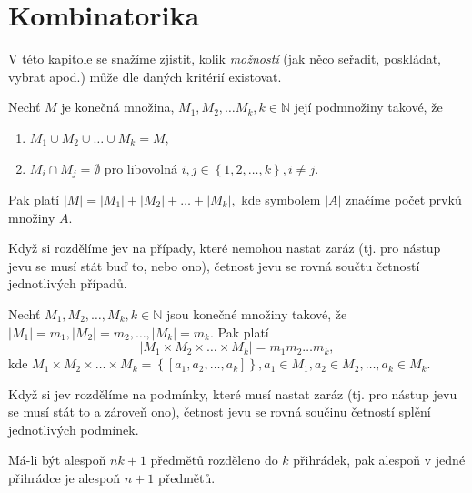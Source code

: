 \section{Kombinatorika}
\begin{pozn}
V této kapitole se snažíme zjistit, kolik \textit{možností} (jak něco seřadit, poskládat, vybrat apod.) může dle daných kritérií existovat.
\end{pozn}

\begin{veta}
    Nechť $M$ je konečná množina, $M_1, M_2, \dots M_k, k
    \in \mathbb N$ její podmnožiny takové, že
    \begin{enumerate}[$i.$]
    \item $M_1\cup M_2 \cup \dots \cup M_k = M,$
   	\item $M_i \cap M_j = \emptyset$ pro libovolná
    $i,j \in \left \{ 1,2,\dots,k \right \},i\ne j $.
    \end{enumerate}
    Pak platí $|M|=|M_1|+|M_2|+\dots +|M_k|,$ kde
    symbolem $|A|$ značíme počet prvků množiny $A$.
\end{veta}

\begin{pozn}
	Když si rozdělíme jev na případy, které nemohou nastat zaráz (tj. pro nástup jevu se musí stát buď to, nebo ono), četnost jevu se rovná součtu četností jednotlivých případů.
\end{pozn}

\begin{veta}
    Nechť $M_1, M_2, \dots, M_k, k\in \mathbb N$ jsou konečné množiny takové,
    že $|M_1| = m_1, |M_2|=m_2, \dots, |M_k| = m_k.$ Pak platí
    $$|M_1\times M_2 \times \dots \times M_k| = m_1m_2\dots m_k,$$
    kde  $M_1\times M_2\times \dots \times M_k= \left \{ \left [ a_1, a_2, \dots, a_k \right ]  \right \}
    , a_1\in M_1, a_2 \in M_2, \dots, a_k \in M_k.$
\end{veta}

\begin{pozn}
	Když si jev rozdělíme na podmínky, které musí nastat zaráz (tj. pro nástup jevu se musí stát to a zároveň ono), četnost jevu se rovná součinu četností splění jednotlivých podmínek.
\end{pozn}

\begin{veta}
    Má-li být alespoň $nk+1$ předmětů rozděleno do $k$ přihrádek, pak
    alespoň v jedné přihrádce je alespoň $n+1$ předmětů.
\end{veta}

